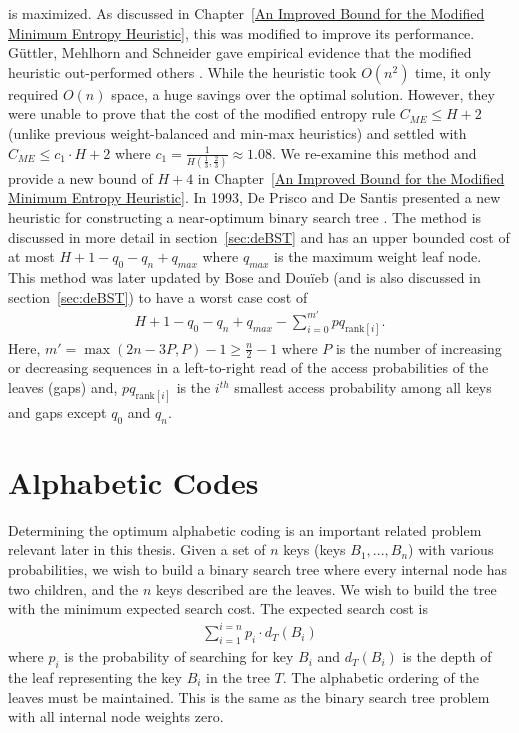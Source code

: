 \documentclass[letterpaper,12pt,titlepage,oneside,final]{book}
\theoremstyle{plain}
\begin{document}
\noindent is maximized. As discussed in Chapter~\ref{An Improved Bound for the Modified Minimum Entropy Heuristic}, this was modified to improve its performance. G{\"u}ttler, Mehlhorn and Schneider gave empirical evidence that the modified heuristic out-performed others \cite{guttler1980binary}. While the heuristic took $O(n^2)$ time, it only required $O(n)$ space, a huge savings over the optimal solution. However, they were unable to prove that the cost of the modified entropy rule $C_{ME} \leq H+2$ (unlike previous weight-balanced and min-max heuristics) and settled with $C_{ME} \leq c_1\cdot H+2$ where $c_1=\frac{1}{H(\frac{1}{3}, \frac{2}{3})} \approx 1.08$. We re-examine this method and provide a new bound of $H+4$ in Chapter~\ref{An Improved Bound for the Modified Minimum Entropy Heuristic}. In 1993, De Prisco and De Santis presented a new heuristic for constructing a near-optimum binary search tree \cite{de1993binary}. The method is discussed in more detail in section~\ref{sec:deBST} and has an upper bounded cost of at most $H+1-q_0-q_n+q_{max}$ where $q_{max}$ is the maximum weight leaf node. This method was later updated by Bose and Dou\"{i}eb (and is also discussed in section~\ref{sec:deBST}) to have a worst case cost of \cite{bose2009efficient}
\begin{align*}
H + 1 - q_0 - q_n + q_{max} - \sum_{i=0}^{m'} pq_{\text{rank}[i]}.
\end{align*}
Here, $m'=\max({2n-3P,P})-1 \geq \frac{n}{2} - 1$ where $P$ is the number of increasing or decreasing sequences in a left-to-right read of the access probabilities of the leaves (gaps) and,  $pq_{\text{rank}[i]}$ is the $i^{th}$ smallest access probability among all keys and gaps except $q_0$ and $q_n$.

 
\section{Alphabetic Codes}

Determining the optimum alphabetic coding is an important related problem relevant later in this thesis. Given a set of $n$ keys (keys $B_1, ..., B_n$) with various probabilities, we wish to build a binary search tree where every internal node has two children, and the $n$ keys described are the leaves. We wish to build the tree with the minimum expected search cost. The expected search cost is
\begin{align*}
\sum_{i=1}^{i=n} p_i \cdot d_T(B_i)
\end{align*}
where $p_i$ is the probability of searching for key $B_i$ and $d_T(B_i)$ is the depth of the leaf representing the key $B_i$ in the tree $T$. The alphabetic ordering of the leaves must be maintained. This is the same as the binary search tree problem with all internal node weights zero.
\end{document}
